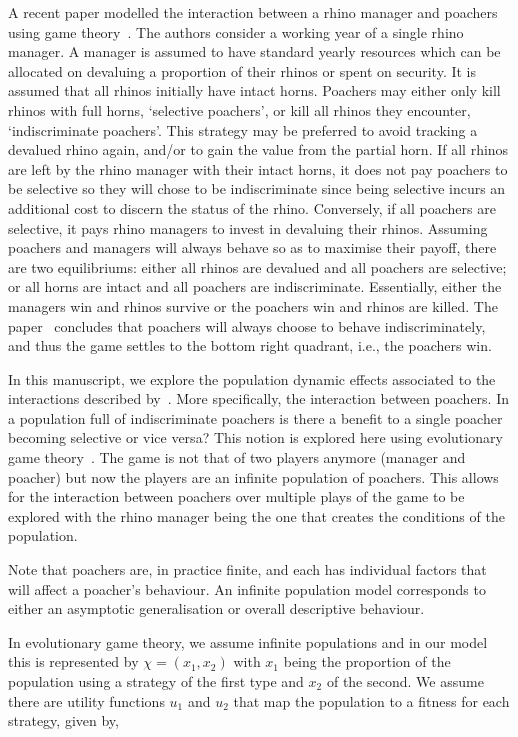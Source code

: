 \documentclass[10pt]{article}
\begin{document}
A recent paper modelled the interaction between a rhino manager and poachers
using game theory~\cite{Lee}. The authors consider a working year of a single
rhino manager. A manager is assumed to have standard yearly resources which
can be allocated on devaluing a proportion of their rhinos or spent on security.
It is assumed that all rhinos initially have intact horns. Poachers may either only
kill rhinos with full horns, `selective poachers', or kill all rhinos they encounter,
`indiscriminate poachers'. This strategy may be preferred to avoid tracking a
devalued rhino again, and/or to gain the value from the partial horn. If all rhinos
are left by the rhino manager with their intact horns, it does not pay poachers to
be selective so they will chose to be indiscriminate since being selective incurs
an additional cost to discern the status of the rhino. Conversely, if all poachers are
selective, it pays rhino managers to invest in devaluing their rhinos.
Assuming poachers and managers will always behave so as to maximise their payoff,
there are two equilibriums: either all rhinos are devalued and all poachers are selective;
or all horns are intact and all poachers are indiscriminate. Essentially, either
the managers win and rhinos survive or the poachers win and rhinos are killed. The
paper~\cite{Lee} concludes that poachers will always choose to behave indiscriminately,
and thus the game settles to the bottom right quadrant, i.e., the poachers win.


In this manuscript, we explore the population dynamic effects associated to
the interactions described by~\cite{Lee}. More specifically, the interaction between
poachers. In a population full of indiscriminate poachers is there
a benefit to a single poacher becoming selective or vice versa? This notion
is explored here using evolutionary game theory~\cite{Smith}. The
game is not that of two players anymore (manager and poacher) but now the players
are an infinite population of poachers. This allows for the interaction between
poachers over multiple plays of the game to be explored with the rhino manager
being the one that creates the conditions of the population.

Note that poachers are, in practice finite, and each has individual factors that will
affect a poacher's behaviour. An infinite population model corresponds to either
an asymptotic generalisation or overall descriptive behaviour.

In evolutionary game theory, we assume infinite populations and in our
model this is represented by \(\chi=(x_1, x_2)\) with \(x_1\) being the proportion
of the population using a strategy of the first type and \(x_2\) of the second. We
assume there are utility functions \(u_1\) and \(u_2\) that map the population
to a fitness for each strategy, given by,
\end{document}
